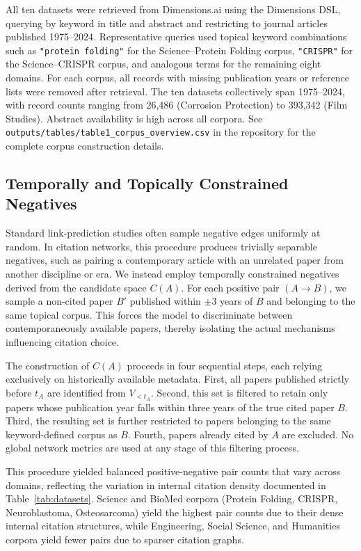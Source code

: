 \documentclass[11pt,a4paper]{article}
\begin{document}
All ten datasets were retrieved from Dimensions.ai \citep{hook2018dimensions} using the Dimensions DSL, querying by keyword in title and abstract and restricting to journal articles published 1975--2024. Representative queries used topical keyword combinations such as \texttt{"protein folding"} for the Science--Protein Folding corpus, \texttt{"CRISPR"} for the Science--CRISPR corpus, and analogous terms for the remaining eight domains. For each corpus, all records with missing publication years or reference lists were removed after retrieval. The ten datasets collectively span 1975--2024, with record counts ranging from 26,486 (Corrosion Protection) to 393,342 (Film Studies). Abstract availability is high across all corpora. See \texttt{outputs/tables/table1\_corpus\_overview.csv} in the repository for the complete corpus construction details.

\subsection{Temporally and Topically Constrained Negatives}

Standard link-prediction studies often sample negative edges uniformly at random. In citation networks, this procedure produces trivially separable negatives, such as pairing a contemporary article with an unrelated paper from another discipline or era. We instead employ temporally constrained negatives derived from the candidate space \(C(A)\). For each positive pair $(A \to B)$, we sample a non-cited paper $B'$ published within $\pm 3$ years of $B$ and belonging to the same topical corpus. This forces the model to discriminate between contemporaneously available papers, thereby isolating the actual mechanisms influencing citation choice.

The construction of $C(A)$ proceeds in four sequential steps, each relying exclusively on historically available metadata. First, all papers published strictly before $t_A$ are identified from $V_{<t_A}$. Second, this set is filtered to retain only papers whose publication year falls within three years of the true cited paper $B$. Third, the resulting set is further restricted to papers belonging to the same keyword-defined corpus as $B$. Fourth, papers already cited by $A$ are excluded. No global network metrics are used at any stage of this filtering process.

This procedure yielded balanced positive-negative pair counts that vary across domains, reflecting the variation in internal citation density documented in Table~\ref{tab:datasets}. Science and BioMed corpora (Protein Folding, CRISPR, Neuroblastoma, Osteosarcoma) yield the highest pair counts due to their dense internal citation structures, while Engineering, Social Science, and Humanities corpora yield fewer pairs due to sparser citation graphs.
\end{document}
